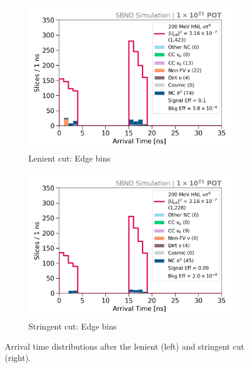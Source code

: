 \begin{figure}[ht!]
\begin{subfigure}[b]{0.495\textwidth}
            \centering 
	    \includegraphics[width=\textwidth]{bb_lenient_edge}
            \caption{Lenient cut: Edge bins}%
	    \label{fig:bb_edge_loose}
        \end{subfigure}
        \hfill
        \begin{subfigure}[b]{0.495\textwidth}   
            \centering 
	    \includegraphics[width=\textwidth]{bb_stringent_edge}
            \caption{Stringent cut: Edge bins}%
	    \label{fig:bb_edge_strict}
        \end{subfigure}
	\caption[Arrival Time Distributions After Selection]{
	Arrival time distributions after the lenient (left) and stringent cut (right).
	}
        \label{fig:timing_cut}
\end{figure}

